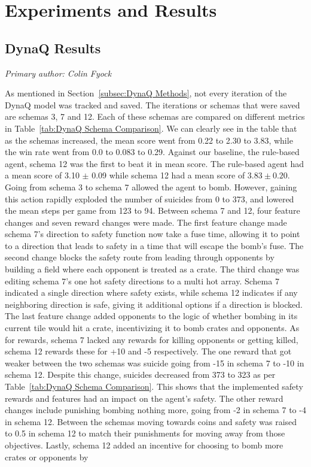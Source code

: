 \documentclass[article, 10pt]{IEEEtran}
\begin{document}
\section{Experiments and Results}\label{sec:6_experimentsandresults}

\subsection{DynaQ Results}

\textit{Primary author: Colin Fyock}

As mentioned in Section~\ref{subsec:DynaQ Methods}, not every iteration of the DynaQ model was tracked and saved. The iterations or schemas that were saved are schemas 3, 7 and 12. Each of these schemas are compared on different metrics in Table~\ref{tab:DynaQ Schema Comparison}. We can clearly see in the table that as the schemas increased, the mean score went from 0.22 to 2.30 to 3.83, while the win rate went from 0.0 to 0.083 to 0.29. Against our baseline, the rule-based agent, schema 12 was the first to beat it in mean score. The rule-based agent had a mean score of 3.10 $\pm$ 0.09 while schema 12 had a mean score of $3.83 \pm 0.20$. Going from schema 3 to schema 7 allowed the agent to bomb. However, gaining this action rapidly exploded the number of suicides from 0 to 373, and lowered the mean steps per game from 123 to 94. Between schema 7 and 12, four feature changes and seven reward changes were made.  The first feature change made schema 7's direction to safety function now take a fuse time, allowing it to point to a direction that leads to safety in a time that will escape the bomb's fuse. The second change blocks the safety route from leading through opponents by building a field where each opponent is treated as a crate. The third change was editing schema 7's one hot safety directions to a multi hot array. Schema 7 indicated a single direction where safety exists, while schema 12 indicates if any neighboring direction is safe, giving it additional options if a direction is blocked. The last feature change added opponents to the logic of whether bombing in its current tile would hit a crate, incentivizing it to bomb crates and opponents. As for rewards, schema 7 lacked any rewards for killing opponents or getting killed, schema 12 rewards these for +10 and -5 respectively. The one reward that got weaker between the two schemas was suicide going from -15 in schema 7 to -10 in schema 12. Despite this change, suicides decreased from 373 to 323 as per Table~\ref{tab:DynaQ Schema Comparison}. This shows that the implemented safety rewards and features had an impact on the agent's safety. The other reward changes include punishing bombing nothing more, going from -2 in schema 7 to -4 in schema 12. Between the schemas moving towards coins and safety was raised to 0.5 in schema 12 to match their punishments for moving away from those objectives. Lastly, schema 12 added an incentive for choosing to bomb more crates or opponents by 
\end{document}
